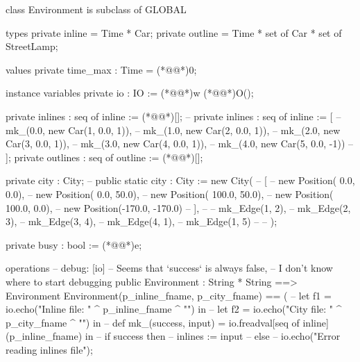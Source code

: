 \documentclass[a4paper]{article}
\begin{document}
\title{}
\author{}
\begin{vdm_al}
class Environment is subclass of GLOBAL

types
    private inline = Time * Car;
    private outline = Time * set of Car * set of StreetLamp;

values
    private time_max : Time = (*@@*)0;

instance variables
    private io : IO := (*@@*)w (*@@*)O();

    private inlines : seq of inline := (*@\vdmnotcovered{}@*)[];
    -- private inlines : seq of inline := [
    --     mk_(0.0, new Car(1, 0.0,  1)),
    --     mk_(1.0, new Car(2, 0.0,  1)),
    --     mk_(2.0, new Car(3, 0.0,  1)),
    --     mk_(3.0, new Car(4, 0.0,  1)),
    --     mk_(4.0, new Car(5, 0.0, -1))
    -- ];
    private outlines : seq of outline := (*@\vdmnotcovered{}@*)[];

    private city : City;
    -- public static city : City := new City(
    --     [
    --         new Position(   0.0,    0.0),
    --         new Position(   0.0,   50.0),
    --         new Position( 100.0,   50.0),
    --         new Position( 100.0,    0.0),
    --         new Position(-170.0, -170.0)
    --     ],
    --     {
    --         mk_Edge(1, 2),
    --         mk_Edge(2, 3),
    --         mk_Edge(3, 4),
    --         mk_Edge(4, 1),
    --         mk_Edge(1, 5)
    --     }
    -- );
    
    private busy : bool := (*@@*)e;

operations
    -- debug: [io]
    --        Seems that `success` is always false,
    --        I don't know where to start debugging
    public Environment : String * String ==> Environment
    Environment(p_inline_fname, p_city_fname) == (
        -- let f1 = io.echo("Inline file: " ^ p_inline_fname ^ "\n") in
        -- let f2 = io.echo("City file: " ^ p_city_fname ^ "\n") in
        -- def mk_(success, input) = io.freadval[seq of inline](p_inline_fname) in
        --     if success then
        --         inlines := input
        --     else
        --         io.echo("Error reading inlines file\n");
        

\end{vdm_al}
\end{document}
